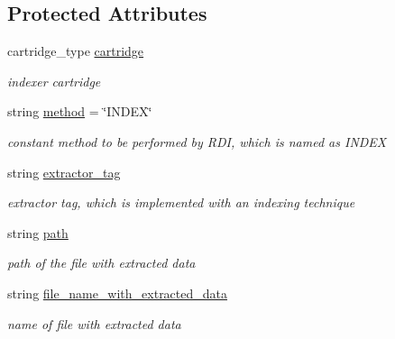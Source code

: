 \subsection*{Protected Attributes}
\begin{DoxyCompactItemize}
\item 
\mbox{\label{classRawDataIndexer_a97457b9fd1fd60fc392e7c482c9291b8}} 
cartridge\+\_\+type \hyperlink{classRawDataIndexer_a97457b9fd1fd60fc392e7c482c9291b8}{cartridge}
\begin{DoxyCompactList}\small\item\em indexer cartridge \end{DoxyCompactList}\item 
\mbox{\label{classRawDataIndexer_ab126e27d3ab911afae60141314846d69}} 
string \hyperlink{classRawDataIndexer_ab126e27d3ab911afae60141314846d69}{method} = \char`\"{}I\+N\+D\+EX\char`\"{}
\begin{DoxyCompactList}\small\item\em constant method to be performed by R\+DI, which is named as I\+N\+D\+EX \end{DoxyCompactList}\item 
\mbox{\label{classRawDataIndexer_a1cd177b09d6617a3cc4977baa9720e23}} 
string \hyperlink{classRawDataIndexer_a1cd177b09d6617a3cc4977baa9720e23}{extractor\+\_\+tag}
\begin{DoxyCompactList}\small\item\em extractor tag, which is implemented with an indexing technique \end{DoxyCompactList}\item 
\mbox{\label{classRawDataIndexer_a5b18b073d000aa553ef7967b6aef857a}} 
string \hyperlink{classRawDataIndexer_a5b18b073d000aa553ef7967b6aef857a}{path}
\begin{DoxyCompactList}\small\item\em path of the file with extracted data \end{DoxyCompactList}\item 
\mbox{\label{classRawDataIndexer_a31ec597c4f1d93cea6c84aefd1c5b5ab}} 
string \hyperlink{classRawDataIndexer_a31ec597c4f1d93cea6c84aefd1c5b5ab}{file\+\_\+name\+\_\+with\+\_\+extracted\+\_\+data}
\begin{DoxyCompactList}\small\item\em name of file with extracted data \end{DoxyCompactList}\item 

\end{DoxyCompactItemize}
